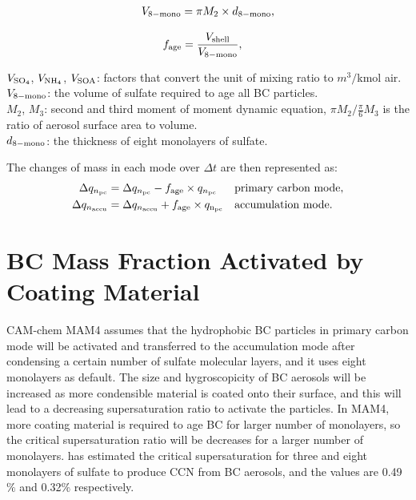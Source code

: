 \documentclass[12pt, fullpage]{uiucthesis2009_2}
\begin{document}
	\begin{align}
	\begin{split}
	V_{\rm{8-mono}} = \pi M_2 \times d_{\rm{8-mono}},
	\end{split}
	\end{align}
	
	\begin{align}
	f_{\rm{age}} &= \frac{V_{\rm{shell}}}{V_{\rm{8-mono}}},  
	\end{align}
	
	\begin{flushleft}
		$V_{\rm{SO_4}}$, $V_{\rm{NH_4}}$, $V_{\rm{SOA}}$: factors that convert the unit of mixing ratio to $m^3/$kmol air. \\
		$V_{\rm{8-mono}}$: the volume of sulfate required to age all BC particles. \\
		$M_2$, $M_3$: second and third moment of  moment dynamic equation, $\pi M_2/ \frac{\pi}{6}M_3$ is the ratio of aerosol surface area to volume. \\
		$d_{\rm{8-mono}}$: the thickness of eight monolayers of sulfate.
	\end{flushleft}
	
	The changes of mass in each mode over $\Delta t$ are then represented as:
	\begin{align}
	\Delta q_{n_{\rm{pc}}} &= \Delta q_{n_{\rm{pc}}} - f_{\rm{age}} \times q_{n_{\rm{pc}}}  &&\text{primary carbon mode}, \\
	\Delta q_{n_{\rm{accu}}} &= \Delta q_{n_{\rm{accu}}} + f_{\rm{age}} \times q_{\rm{n_{\rm{pc}}}}  &&\text{accumulation mode}.
	\end{align}
	
		\section{BC Mass Fraction Activated by Coating Material}
		CAM-chem MAM4 assumes that the hydrophobic BC particles in  primary carbon mode will be activated and transferred to the accumulation mode after condensing a certain number of sulfate molecular layers, and it uses eight monolayers as default. The size and hygroscopicity of BC aerosols will be increased as more condensible material is coated onto their surface, and this will lead to a decreasing supersaturation ratio to activate the particles. In MAM4, more coating material is required to age BC for larger number of monolayers, so the critical supersaturation ratio will be decreases for a larger number of monolayers. \citet{Liu2012} has estimated the critical supersaturation for three and eight monolayers of sulfate to produce CCN from BC aerosols, and the values are 0.49$\%$ and 0.32$\%$ respectively. 
		
\end{document}
